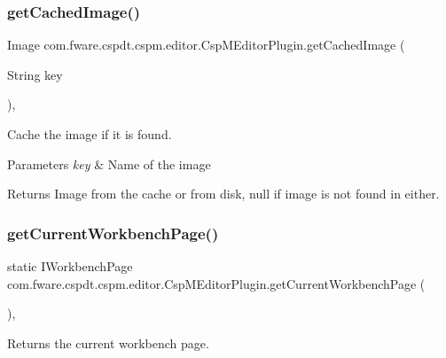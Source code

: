 \subsubsection{\texorpdfstring{get\+Cached\+Image()}{getCachedImage()}}
{\footnotesize\ttfamily Image com.\+fware.\+cspdt.\+cspm.\+editor.\+Csp\+M\+Editor\+Plugin.\+get\+Cached\+Image (\begin{DoxyParamCaption}\item[{String}]{key }\end{DoxyParamCaption})\hspace{0.3cm}{\ttfamily [inline]}, {\ttfamily [protected]}}



Cache the image if it is found. 


\begin{DoxyParams}{Parameters}
{\em key} & Name of the image \\
\hline
\end{DoxyParams}
\begin{DoxyReturn}{Returns}
Image from the cache or from disk, null if image is not found in either. 
\end{DoxyReturn}
\mbox{\label{classcom_1_1fware_1_1cspdt_1_1cspm_1_1editor_1_1_csp_m_editor_plugin_a42cad1fb2c902c98a3e479bd45c6e0ab}} 
\subsubsection{\texorpdfstring{get\+Current\+Workbench\+Page()}{getCurrentWorkbenchPage()}}
{\footnotesize\ttfamily static I\+Workbench\+Page com.\+fware.\+cspdt.\+cspm.\+editor.\+Csp\+M\+Editor\+Plugin.\+get\+Current\+Workbench\+Page (\begin{DoxyParamCaption}{ }\end{DoxyParamCaption})\hspace{0.3cm}{\ttfamily [inline]}, {\ttfamily [static]}}



Returns the current workbench page. 


